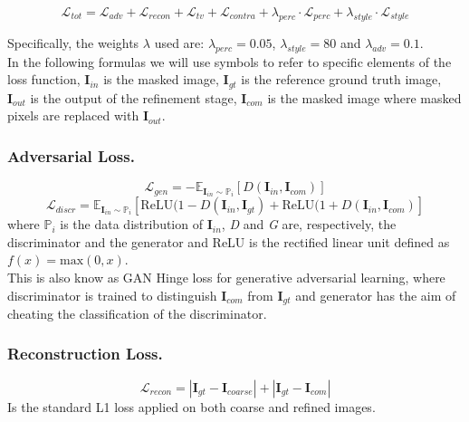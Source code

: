 \documentclass[10pt,twocolumn,letterpaper]{article}
\begin{document}
\begin{dmath}
      \mathcal{L}_{tot} = \mathcal{L}_{adv} + \mathcal{L}_{recon} +
      \mathcal{L}_{tv} + \mathcal{L}_{contra} + \lambda_{perc} \cdot
      \mathcal{L}_{perc} + \lambda_{style} \cdot \mathcal{L}_{style}
\end{dmath}

Specifically, the weights $\lambda$ used are: $\lambda_{perc} = 0.05$,
$\lambda_{style} = 80$ and $\lambda_{adv} = 0.1$.\\
In the following formulas we will use symbols to refer to specific elements of
the loss function, $\mathbf{I}_{in}$ is the masked image, $\mathbf{I}_{gt}$ is
the reference ground truth image, $\mathbf{I}_{out}$ is the output of the
refinement stage, $\mathbf{I}_{com}$ is the masked image where masked pixels are
replaced with $\mathbf{I}_{out}$. \\

\subsubsection{Adversarial Loss.}
\begin{dmath}
    \mathcal{L}_{gen} = -\mathbb{E}_{\mathbf{I}_{in} \sim \mathbb{P}_i}
    [D(\mathbf{I}_{in},\mathbf{I}_{com})]
\end{dmath}
\begin{dmath}
    \mathcal{L}_{discr} = \mathbb{E}_{\mathbf{I}_{in} \sim \mathbb{P}_i}
    [\mathrm{ReLU}(1-D(\mathbf{I}_{in},\mathbf{I}_{gt}) +
    \mathrm{ReLU}(1+D(\mathbf{I}_{in},\mathbf{I}_{com})]
\end{dmath}
where \(\mathbb{P}_i\) is the data distribution of $\mathbf{I}_{in}$, \textit{D}
and \textit{G} are, respectively, the discriminator and the generator and ReLU
is the rectified linear unit defined as \(f(x) = \mathrm{max}(0,x)\).\\ This is
also know as GAN Hinge loss for generative adversarial learning, where
discriminator is trained to distinguish $\mathbf{I}_{com}$ from $\mathbf{I}_{gt}$ and generator
has the aim of cheating the classification of the discriminator.

\subsubsection{Reconstruction Loss.}
\begin{dmath}
  \mathcal{L}_{recon} = |\mathbf{I}_{gt} - \mathbf{I}_{coarse}| + |\mathbf{I}_{gt} - \mathbf{I}_{com}|
\end{dmath}
Is the standard L1 loss applied on both coarse and refined images.
\end{document}
